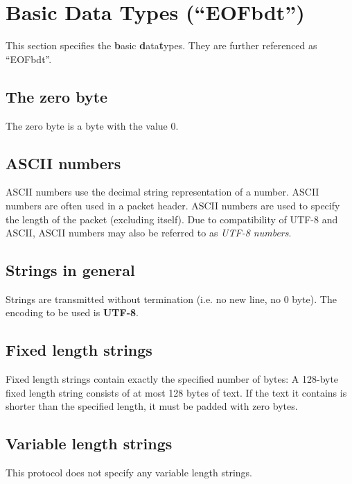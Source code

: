\section{Basic Data Types ("`EOFbdt"')}
This section specifies the \textbf{b}asic \textbf{d}ata\textbf{t}ypes. 
They are further referenced as "`EOFbdt"'.
\subsection{The zero byte}
The zero byte is a byte with the value 0.
\subsection{ASCII numbers}
ASCII numbers use the decimal string representation of a number.
ASCII numbers are often used in a packet header.
ASCII numbers are used to specify the length of the packet (excluding itself).
Due to compatibility of UTF-8 and ASCII, ASCII numbers may also be referred to
as \textit{UTF-8 numbers}.
\subsection{Strings in general}
Strings are transmitted without termination (i.e. no new line, no 0 byte).
The encoding to be used is \textbf{UTF-8}.
\subsection{Fixed length strings}
Fixed length strings contain exactly the specified number of bytes:
A 128-byte fixed length string consists of at most 128 bytes of text.
If the text it contains is shorter than the specified length,
it must be padded with zero bytes.
\subsection{Variable length strings}
This protocol does not specify any variable length strings.

